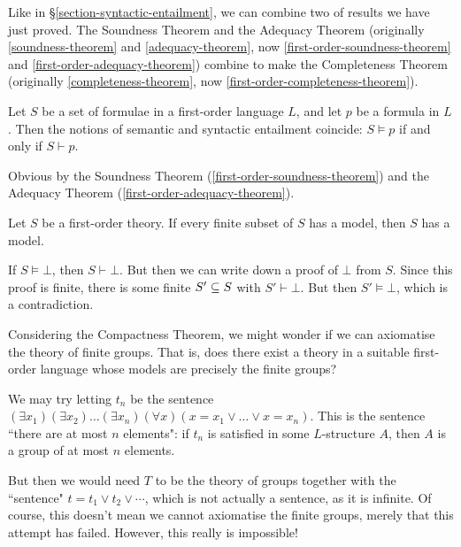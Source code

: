 \documentclass{article}
\begin{document}
Like in \S\ref{section-syntactic-entailment}, we can combine two of results we have just proved. The Soundness Theorem and the Adequacy Theorem (originally \ref{soundness-theorem} and \ref{adequacy-theorem}, now \ref{first-order-soundness-theorem} and \ref{first-order-adequacy-theorem}) combine  to make the Completeness Theorem (originally \ref{completeness-theorem}, now \ref{first-order-completeness-theorem}).

\begin{theorem}
    \label{first-order-completeness-theorem}
    Let $S$ be a set of formulae in a first-order language $L$, and let $p$ be a formula in $L$. Then the notions of semantic and syntactic entailment coincide: $S \vDash p$ if and only if $S \vdash p$.
\end{theorem}

\begin{prf}
    Obvious by the Soundness Theorem (\ref{first-order-soundness-theorem}) and the Adequacy Theorem (\ref{first-order-adequacy-theorem}).
\end{prf}

\begin{theorem}
    Let $S$ be a first-order theory. If every finite subset of $S$ has a model, then $S$ has a model.
\end{theorem}

\begin{prf}
    If $S \vDash \bot$, then $S \vdash \bot$. But then we can write down a proof of $\bot$ from $S$. Since this proof is finite, there is some finite $S' \subseteq S$ with $S' \vdash \bot$. But then $S' \vDash \bot$, which is a contradiction.
\end{prf}

Considering the Compactness Theorem, we might wonder if we can axiomatise the theory of finite groups. That is, does there exist a theory in a suitable first-order language whose models are precisely the finite groups?

We may try letting $t_n$ be the sentence $(\exists x_1)(\exists x_2)\dots(\exists x_n)(\forall x)(x = x_1 \lor \dots \lor x = x_n)$. This is the sentence ``there are at most $n$ elements": if $t_n$ is satisfied in some $L$-structure $A$, then $A$ is a group of at most $n$ elements.

But then we would need $T$ to be the theory of groups together with the ``sentence" $t = t_1 \lor t_2 \lor \cdots$, which is not actually a sentence, as it is infinite. Of course, this doesn't mean we cannot axiomatise the finite groups, merely that this attempt has failed. However, this really is impossible!
\end{document}
